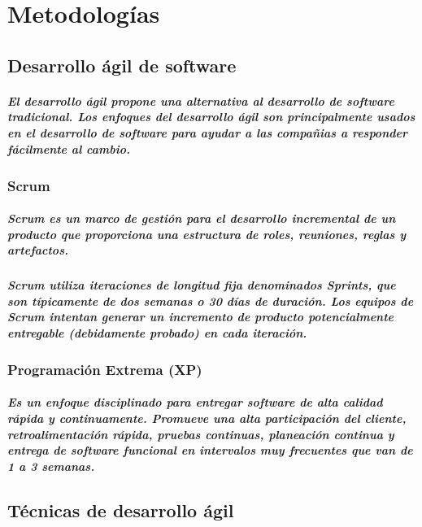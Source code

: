 \clearpage
\chapter{Metodologías}

\section{Desarrollo ágil de software}
  \paragraph{El desarrollo ágil propone una alternativa al desarrollo de software tradicional. Los enfoques del desarrollo ágil son principalmente usados en el desarrollo de software para ayudar a las compañias a responder fácilmente al cambio.}

\subsection{Scrum}
  \paragraph{Scrum es un marco de gestión para el desarrollo incremental de un producto que proporciona una estructura de roles, reuniones, reglas y artefactos.}
  \paragraph{Scrum utiliza iteraciones de longitud fija denominados Sprints, que son típicamente de dos semanas o 30 días de duración. Los equipos de Scrum intentan generar un incremento de producto potencialmente entregable (debidamente probado) en cada iteración.}
  
 \subsection{Programación Extrema (XP)}
  \paragraph{Es un enfoque disciplinado para entregar software de alta calidad rápida y continuamente. Promueve una alta participación del cliente, retroalimentación rápida, pruebas continuas, planeación continua y entrega de software funcional en intervalos muy frecuentes que van de 1 a 3 semanas.}
  
\section{Técnicas de desarrollo ágil}

